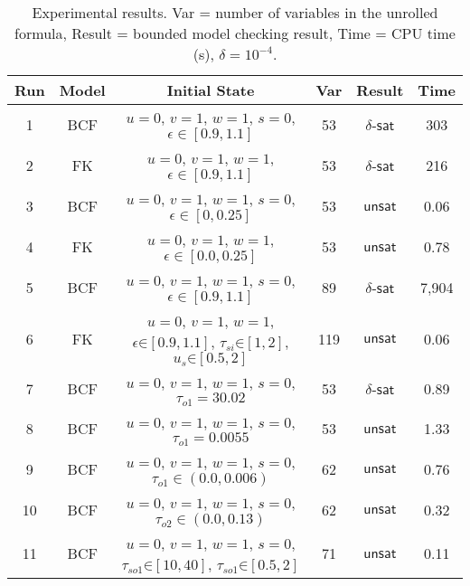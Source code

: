 {\small
\begin{table}[!th]
  \centering
  \small
  \begin{tabular}{c|c|c|c|c|c}
    \hline
    \hline
    Run & Model   & Initial State  & Var  & Result   & Time   \\
    \hline
    \hline
    1 & BCF & $u = 0$, $v = 1$, $w = 1$, $s = 0$, $\epsilon \in [0.9,1.1]$ & 53  & $\delta$-$\mathsf{sat}$  & 303 \\
    2 & FK & $u = 0$, $v = 1$, $w = 1$, $\epsilon \in [0.9,1.1]$  & 53 & $\delta$-$\mathsf{sat}$ & 216 \\
    3 & BCF & $u = 0$, $v = 1$, $w = 1$, $s = 0$, $\epsilon \in [0,0.25]$ & 53  & $\mathsf{unsat}$  & 0.06 \\
    4 & FK & $u = 0$, $v = 1$, $w = 1$, $\epsilon \in [0.0,0.25]$  & 53 & $\mathsf{unsat}$ & 0.78 \\
    5 & BCF & $u = 0$, $v = 1$, $w = 1$, $s = 0$, $\epsilon \in [0.9,1.1]$  & 89  & $\delta$-$\mathsf{sat}$  & 7,904 \\
    6 & FK & $u = 0$, $v = 1$, $w = 1$, $\epsilon \mathord{\in} [0.9,1.1]$, $\tau_{si} \mathord{\in} [1,2]$, $u_{s} \mathord{\in} [0.5,2]$  & 119 & $\mathsf{unsat}$ & 0.06 \\   
    7 & BCF & $u = 0$, $v = 1$, $w = 1$, $s = 0$, $\tau_{o1} = 30.02$ & 53  & $\delta$-$\mathsf{sat}$  & 0.89 \\        
    8 & BCF & $u = 0$, $v = 1$, $w = 1$, $s = 0$, $\tau_{o1} = 0.0055$ & 53  & $\mathsf{unsat}$  & 1.33 \\        
    9 & BCF & $u = 0$, $v = 1$, $w = 1$, $s = 0$, $\tau_{o1} \in (0.0, 0.006)$ & 62  & $\mathsf{unsat}$  & 0.76 \\        
    10 & BCF & $u = 0$, $v = 1$, $w = 1$, $s = 0$, $\tau_{o2} \in (0.0, 0.13)$  & 62  & $\mathsf{unsat}$  & 0.32 \\     
    11 & BCF & $u = 0$, $v = 1$, $w = 1$, $s = 0$, $\tau_{so1} \mathord{\in} [10, 40]$, $\tau_{so1}\mathord{\in} [0.5, 2]$ & 71  & $\mathsf{unsat}$  & 0.11 \\   
    \hline
    \hline
  \end{tabular}
  \caption{\small Experimental results.
    Var = number of variables in the unrolled formula,
    Result = bounded model checking result,
    Time = CPU time (s),
    $\delta=10^{-4}$.
}\label{tbl:exp}
\end{table}
}

